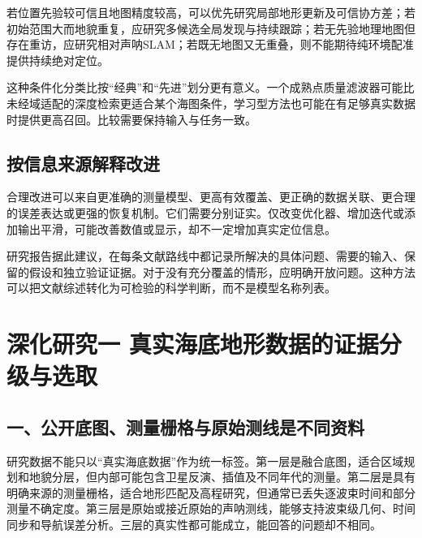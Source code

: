 若位置先验较可信且地图精度较高，可以优先研究局部地形更新及可信协方差；若初始范围大而地貌重复，应研究多候选全局发现与持续跟踪；若无先验地理地图但存在重访，应研究相对声呐SLAM；若既无地图又无重叠，则不能期待纯环境配准提供持续绝对定位。

这种条件化分类比按``经典''和``先进''划分更有意义。一个成熟点质量滤波器可能比未经域适配的深度检索更适合某个海图条件，学习型方法也可能在有足够真实数据时提供更高召回。比较需要保持输入与任务一致。

\hypertarget{ux6309ux4fe1ux606fux6765ux6e90ux89e3ux91caux6539ux8fdb}{%
\subsection{按信息来源解释改进}\label{ux6309ux4fe1ux606fux6765ux6e90ux89e3ux91caux6539ux8fdb}}

合理改进可以来自更准确的测量模型、更高有效覆盖、更正确的数据关联、更合理的误差表达或更强的恢复机制。它们需要分别证实。仅改变优化器、增加迭代或添加输出平滑，可能改善数值或显示，却不一定增加真实定位信息。

研究报告据此建议，在每条文献路线中都记录所解决的具体问题、需要的输入、保留的假设和独立验证证据。对于没有充分覆盖的情形，应明确开放问题。这种方法可以把文献综述转化为可检验的科学判断，而不是模型名称列表。

\hypertarget{ux6df1ux5316ux7814ux7a76ux4e00-ux771fux5b9eux6d77ux5e95ux5730ux5f62ux6570ux636eux7684ux8bc1ux636eux5206ux7ea7ux4e0eux9009ux53d6}{%
\section{深化研究一 真实海底地形数据的证据分级与选取}\label{ux6df1ux5316ux7814ux7a76ux4e00-ux771fux5b9eux6d77ux5e95ux5730ux5f62ux6570ux636eux7684ux8bc1ux636eux5206ux7ea7ux4e0eux9009ux53d6}}

\hypertarget{ux4e00ux516cux5f00ux5e95ux56feux6d4bux91cfux6805ux683cux4e0eux539fux59cbux6d4bux7ebfux662fux4e0dux540cux8d44ux6599}{%
\subsection{一、公开底图、测量栅格与原始测线是不同资料}\label{ux4e00ux516cux5f00ux5e95ux56feux6d4bux91cfux6805ux683cux4e0eux539fux59cbux6d4bux7ebfux662fux4e0dux540cux8d44ux6599}}

研究数据不能只以``真实海底数据''作为统一标签。第一层是融合底图，适合区域规划和地貌分层，但内部可能包含卫星反演、插值及不同年代的测量。第二层是具有明确来源的测量栅格，适合地形匹配及高程研究，但通常已丢失逐波束时间和部分测量不确定度。第三层是原始或接近原始的声呐测线，能够支持波束级几何、时间同步和导航误差分析。三层的真实性都可能成立，能回答的问题却不相同。

